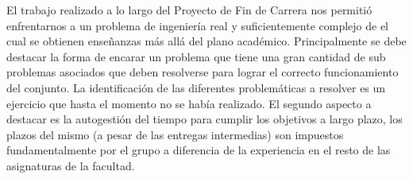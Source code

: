 \documentclass[main]{subfiles}
\begin{document}
El trabajo realizado a lo largo del Proyecto de Fin de Carrera nos permiti\'o enfrentarnos a un problema de ingenier\'ia real y suficientemente complejo de el cual se obtienen enseñanzas m\'as all\'a del plano acad\'emico. Principalmente se debe destacar la forma de encarar un problema que tiene una gran cantidad de sub problemas asociados que deben resolverse para lograr el correcto funcionamiento del conjunto. La identificaci\'on de las diferentes problem\'aticas a resolver es un ejercicio que hasta el momento no se hab\'ia realizado. El segundo aspecto a destacar es la autogesti\'on del tiempo para cumplir los objetivos a largo plazo, los plazos del mismo (a pesar de las entregas intermedias) son impuestos fundamentalmente por el grupo a diferencia de la experiencia en el resto de las asignaturas de la facultad. 
\end{document}
